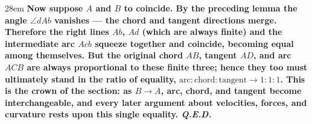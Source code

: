 \documentclass[border=4pt]{standalone}
\begin{document}
\begin{varwidth}{28em}
\large\bfseries
Now suppose $A$ and $B$ to coincide. By the preceding lemma the angle $\angle dAb$      vanishes --- the chord and tangent directions merge. Therefore the right lines $Ab$, $Ad$ (which      are always finite) and the intermediate arc $Acb$ squeeze together and      coincide, becoming equal among themselves. But the original chord $AB$,      tangent $AD$, and arc $ACB$ are always proportional to these finite three; hence they too must      ultimately stand in the ratio of equality, $\text{arc}:\text{chord}:\text{tangent}\to 1:1:1$.      This is the crown of the section: as $B\to A$, arc, chord, and tangent become interchangeable,      and every later argument about velocities, forces, and curvature rests upon this single equality.      \textit{Q.E.D.}
\end{varwidth}
\end{document}
